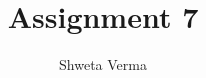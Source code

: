 \documentclass[journal,12pt,twocolumn]{IEEEtran}
\begin{document}
\makeatletter
{}
\makeatother
\let\StandardTheFigure\thefigure
\let\vec\mathbf
\renewcommand{\thefigure}{\theproblem}
\def\putbox#1#2#3{\makebox[0in][l]{\makebox[#1][l]{}\raisebox{\baselineskip}[0in][0in]{\raisebox{#2}[0in][0in]{#3}}}}
     \def\rightbox#1{\makebox[0in][r]{#1}}
     \def\centbox#1{\makebox[0in]{#1}}
     \def\topbox#1{\raisebox{-\baselineskip}[0in][0in]{#1}}
     \def\midbox#1{\raisebox{-0.5\baselineskip}[0in][0in]{#1}}
\vspace{3cm}
\title{Assignment 7}
\author{Shweta Verma}
%
%
%
% 
%
\end{document}

